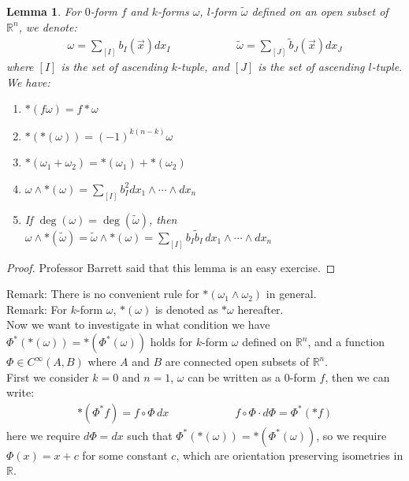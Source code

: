\documentclass[11pt,oneside]{book}
\theoremstyle{break}
\theoremstyle{break}
\newtheorem{lem}{Lemma}[thm]
\newcommand{\R}{\mathbb{R}}
\newcommand{\that}[1]{\widetilde{#1}}
\newcommand{\remark}{\color{blue}Remark: \color{black}}
\begin{document}
\begin{lem}
For $0$-form $f$ and $k$-forms $\omega$, $l$-form $\that{\omega}$ defined on an open subset of $\R^n$, we denote:
\begin{align*}
\omega = \sum_{[I]} b_I(\vec{x}) dx_I \qquad\qquad\qquad\that{\omega} =\sum_{[J]} \that{b}_J(\vec{x}) dx_J
\end{align*}
where $[I]$ is the set of ascending $k$-tuple, and $[J]$ is the set of ascending $l$-tuple. We have: 
\begin{enumerate}[topsep=3pt,itemsep=-1ex,partopsep=1ex,parsep=1ex]
\item $*(f\omega) = f*\omega$
\item $*(*(\omega)) = (-1)^{k(n-k)}\omega$
\item $*(\omega_1 + \omega_2) = *(\omega_1) + *(\omega_2)$
\item $\omega\wedge *(\omega) = \sum_{[I]}b_I^2 dx_1 \wedge \cdots\wedge dx_n$
\item If $\deg(\omega) = \deg(\that{\omega})$, then $\omega \wedge *(\that{\omega}) = \that{\omega}\wedge *(\omega) = \sum_{[I]} b_I \that{b}_I \, dx_1 \wedge \cdots \wedge dx_n$
\end{enumerate}
\end{lem}
\begin{proof}
Professor Barrett said that this lemma is an easy exercise.
\end{proof}

\remark There is no convenient rule for $*(\omega_1 \wedge \omega_2)$ in general.\\

\remark For $k$-form $\omega$, $*(\omega)$ is denoted as $*\omega$ hereafter. \\

Now we want to investigate in what condition we have $\Phi^*(*(\omega)) = *(\Phi^*(\omega))$ holds for $k$-form $\omega$ defined on $\R^n$, and a function $\Phi\in C^\infty(A, B)$ where $A$ and $B$ are connected open subsets of $\R^n$. \\

First we consider $k=0$ and $n=1$, $\omega$ can be written as a $0$-form $f$, then we can write:
\begin{align*}
*(\Phi^*f)=f\circ \Phi\, dx      \qquad\qquad\qquad    f\circ \Phi \cdot d\Phi = \Phi^*(*f)
\end{align*}
here we require $d\Phi = dx$ such that $\Phi^*(*(\omega)) = *(\Phi^*(\omega))$, so we require $\Phi(x) = x+c$ for some constant $c$, which are orientation preserving isometries in $\R$.\\
\end{document}
